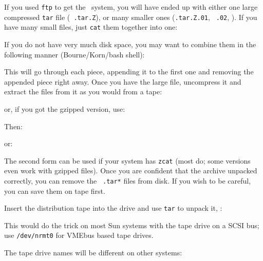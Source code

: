 If you used {\tt ftp} to get the \AIPS\ system, you will have ended
up with either one large compressed {\tt tar} file ({\tt
\thisver.tar.Z}), or many smaller ones ({\tt\thisver.tar.Z.01}, {\tt
.02}, \etc).  If you have many small files, just {\tt cat} them together
into one:\medskip

\medskip

\noindent If you do not have very much disk space, you may want to combine
them in the following manner (Bourne/Korn/bash shell):\medskip

\medskip

\noindent This will go through each piece, appending it to the first one
and removing the appended piece right away.  Once you have the large
file, uncompress it and extract the files from it as you would from a
tape:\medskip

\medskip

\noindent or, if you got the gzipped version, use:\medskip

\medskip

\noindent Then:\medskip

\noindent or:\medskip
{}\medskip

\noindent The second form can be used if your system has {\tt zcat}
(most do; some versions even work with gzipped files).  Once you are
confident that the archive unpacked correctly, you can remove the {\tt
.tar*} files from disk.  If you wish to be careful, you can save them on
tape first.\medskip


Insert the distribution tape into the drive and use {\tt tar} to unpack
it, \eg:\medskip

\medskip

\noindent This would do the trick on most Sun systems with the tape
drive on a SCSI bus; use {\tt /dev/nrmt0} for VMEbus based tape drives.

The tape drive names will be different on other systems:\medskip

